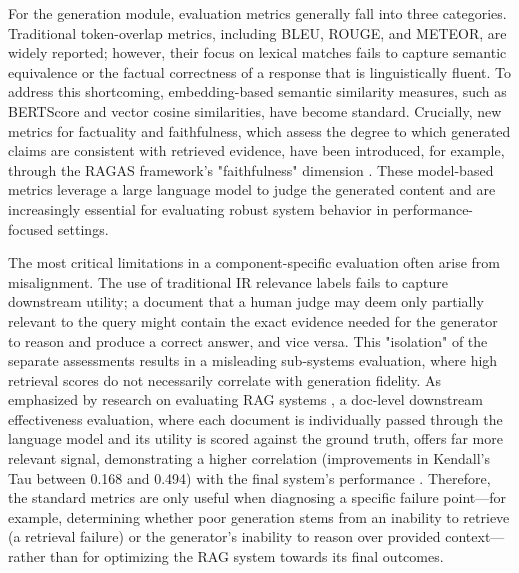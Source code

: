 \documentclass[11pt,a4paper]{article}
\begin{document}
For the generation module, evaluation metrics generally fall into three categories. Traditional token-overlap metrics, including BLEU, ROUGE, and METEOR, are widely reported; however, their focus on lexical matches fails to capture semantic equivalence or the factual correctness of a response that is linguistically fluent. To address this shortcoming, embedding-based semantic similarity measures, such as BERTScore and vector cosine similarities, have become standard. Crucially, new metrics for factuality and faithfulness, which assess the degree to which generated claims are consistent with retrieved evidence, have been introduced, for example, through the RAGAS framework's "faithfulness" dimension \cite{arxiv:2309.15217v1,arxiv:2310.07521v3}. These model-based metrics leverage a large language model to judge the generated content and are increasingly essential for evaluating robust system behavior in performance-focused settings.

The most critical limitations in a component-specific evaluation often arise from misalignment. The use of traditional IR relevance labels fails to capture downstream utility; a document that a human judge may deem only partially relevant to the query might contain the exact evidence needed for the generator to reason and produce a correct answer, and vice versa. This "isolation" of the separate assessments results in a misleading sub-systems evaluation, where high retrieval scores do not necessarily correlate with generation fidelity. As emphasized by research on evaluating RAG systems \cite{arxiv:2405.07437v2}, a doc-level downstream effectiveness evaluation, where each document is individually passed through the language model and its utility is scored against the ground truth, offers far more relevant signal, demonstrating a higher correlation (improvements in Kendall's Tau between 0.168 and 0.494) with the final system's performance \cite{arxiv:2404.13781v1}. Therefore, the standard metrics are only useful when diagnosing a specific failure point---for example, determining whether poor generation stems from an inability to retrieve (a retrieval failure) or the generator's inability to reason over provided context---rather than for optimizing the RAG system towards its final outcomes.
\end{document}
